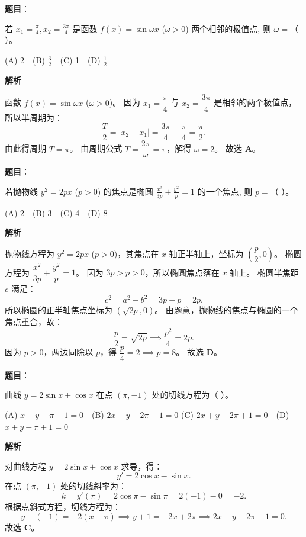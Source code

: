 \begin{answer}

\textbf{题目}：

若 $x_1 = \frac{\pi}{4}, x_2 = \frac{3\pi}{4}$ 是函数 $f(x) = \sin\omega x$ ($\omega > 0$) 两个相邻的极值点, 则 $\omega =$（ ）。

(A) 2　(B) $\frac{3}{2}$　(C) 1　(D) $\frac{1}{2}$

\textbf{解析}

函数 $f(x) = \sin\omega x$ ($\omega > 0$)。
因为 $x_1 = \dfrac{\pi}{4}$ 与 $x_2 = \dfrac{3\pi}{4}$ 是相邻的两个极值点，
所以半周期为：
\nopagebreak[4]
\[\frac{T}{2} = |x_2 - x_1| = \frac{3\pi}{4} - \frac{\pi}{4} = \frac{\pi}{2}.\]
由此得周期 $T = \pi$。
由周期公式 $T = \dfrac{2\pi}{\omega} = \pi$，解得 $\omega = 2$。
故选 \textbf{A}。


\end{answer}
\begin{answer}

\textbf{题目}：

若抛物线 $y^2 = 2px$ ($p > 0$) 的焦点是椭圆 $\frac{x^2}{3p} + \frac{y^2}{p} = 1$ 的一个焦点, 则 $p =$（ ）。

(A) 2　(B) 3　(C) 4　(D) 8

\textbf{解析}

抛物线方程为 $y^2 = 2px$ ($p > 0$)，其焦点在 $x$ 轴正半轴上，坐标为 $(\dfrac{p}{2}, 0)$。
椭圆方程为 $\dfrac{x^2}{3p} + \dfrac{y^2}{p} = 1$。
因为 $3p > p > 0$，所以椭圆焦点落在 $x$ 轴上。
椭圆半焦距 $c$ 满足：
\nopagebreak[4]
\[c^2 = a^2 - b^2 = 3p - p = 2p.\]
所以椭圆的正半轴焦点坐标为 $(\sqrt{2p}, 0)$。
由题意，抛物线的焦点与椭圆的一个焦点重合，故：
\nopagebreak[4]
\[\frac{p}{2} = \sqrt{2p} \implies \frac{p^2}{4} = 2p.\]
因为 $p > 0$，两边同除以 $p$，得 $\dfrac{p}{4} = 2 \implies p = 8$。
故选 \textbf{D}。


\end{answer}
\begin{answer}

\textbf{题目}：

曲线 $y = 2\sin x + \cos x$ 在点 $(\pi, -1)$ 处的切线方程为（ ）。

(A) $x - y - \pi - 1 = 0$　(B) $2x - y - 2\pi - 1 = 0$
(C) $2x + y - 2\pi + 1 = 0$　(D) $x + y - \pi + 1 = 0$

\textbf{解析}

对曲线方程 $y = 2\sin x + \cos x$ 求导，得：
\nopagebreak[4]
\[y' = 2\cos x - \sin x.\]
在点 $(\pi, -1)$ 处的切线斜率为：
\nopagebreak[4]
\[k = y'(\pi) = 2\cos\pi - \sin\pi = 2(-1) - 0 = -2.\]
根据点斜式方程，切线方程为：
\nopagebreak[4]
\[y - (-1) = -2(x - \pi) \implies y + 1 = -2x + 2\pi \implies 2x + y - 2\pi + 1 = 0.\]
故选 \textbf{C}。


\end{answer}
